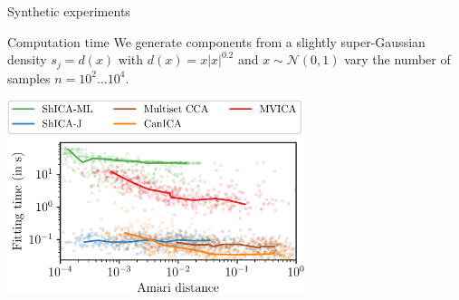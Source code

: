 \documentclass[bigger]{beamer}
\begin{document}
\begin{frame}{Synthetic experiments}
  \begin{block}{Computation time}
    We generate components from a slightly super-Gaussian density $s_j = d(x)$
    with $d(x) = x |x|^{0.2}$ and $x \sim \mathcal{N}(0, 1)$ vary the number of
    samples $n=10^2 \dots 10^4$.
  \end{block}
  \begin{center}
    \includegraphics[width=0.65\textwidth]{./figures/synthetic_gaussian_timings.pdf}
  \end{center}
\end{frame}
\end{document}
